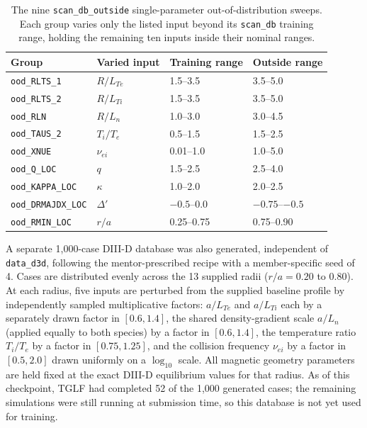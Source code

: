 \documentclass[12pt,letterpaper]{article}
\begin{document}
\begin{table}[htbp]
  \centering
  \small
  \begin{tabular}{llll}
    \toprule
    Group                      & Varied input          & Training range & Outside range \\
    \midrule
    \texttt{ood\_RLTS\_1}      & $R/L_{Te}$             & 1.5--3.5        & 3.5--5.0       \\
    \texttt{ood\_RLTS\_2}      & $R/L_{Ti}$             & 1.5--3.5        & 3.5--5.0       \\
    \texttt{ood\_RLN}          & $R/L_{n}$              & 1.0--3.0        & 3.0--4.5       \\
    \texttt{ood\_TAUS\_2}      & $T_i/T_e$              & 0.5--1.5        & 1.5--2.5       \\
    \texttt{ood\_XNUE}         & $\nu_{ei}$             & 0.01--1.0       & 1.0--5.0       \\
    \texttt{ood\_Q\_LOC}       & $q$                    & 1.5--2.5        & 2.5--4.0       \\
    \texttt{ood\_KAPPA\_LOC}   & $\kappa$               & 1.0--2.0        & 2.0--2.5       \\
    \texttt{ood\_DRMAJDX\_LOC} & $\Delta'$              & $-0.5$--0.0     & $-0.75$--$-0.5$ \\
    \texttt{ood\_RMIN\_LOC}    & $r/a$                  & 0.25--0.75      & 0.75--0.90     \\
    \bottomrule
  \end{tabular}
  \caption{The nine \texttt{scan\_db\_outside} single-parameter
    out-of-distribution sweeps. Each group varies only the listed input beyond
    its \texttt{scan\_db} training range, holding the remaining ten inputs
    inside their nominal ranges.}
  \label{tab:ood-sweeps}
\end{table}

A separate 1,000-case DIII-D database was also generated, independent of
\texttt{data\_d3d}, following the mentor-prescribed recipe with a
member-specific seed of 4. Cases are distributed evenly across the 13
supplied radii ($r/a = 0.20$ to $0.80$). At each radius, five inputs are
perturbed from the supplied baseline profile by independently sampled
multiplicative factors: $a/L_{Te}$ and $a/L_{Ti}$ each by a separately drawn
factor in $[0.6, 1.4]$, the shared density-gradient scale $a/L_n$
(applied equally to both species) by a factor in $[0.6, 1.4]$, the
temperature ratio $T_i/T_e$ by a factor in $[0.75, 1.25]$, and the collision
frequency $\nu_{ei}$ by a factor in $[0.5, 2.0]$ drawn uniformly on a
$\log_{10}$ scale. All magnetic geometry parameters are held fixed at the
exact DIII-D equilibrium values for that radius. As of this checkpoint, TGLF
had completed 52 of the 1,000 generated cases; the remaining simulations were
still running at submission time, so this database is not yet used for
training.
\end{document}
